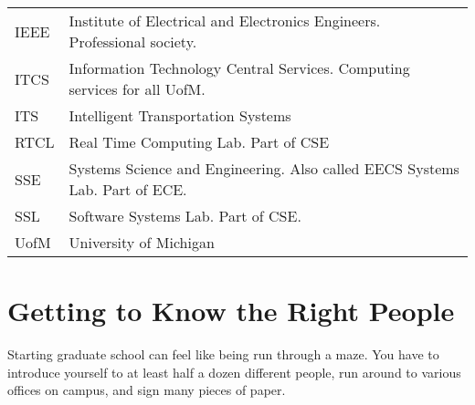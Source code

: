 \documentclass[11pt]{article}
\begin{document}
\begin{center}
\begin{tabular}{ll}
 IEEE              &  Institute of Electrical and Electronics Engineers.  Professional society.           \\
 ITCS              &  Information Technology Central Services.  Computing services for all UofM.          \\
 ITS               &  Intelligent Transportation Systems                                                  \\
 RTCL              &  Real Time Computing Lab.  Part of CSE                                               \\
 SSE               &  Systems Science and Engineering.  Also called EECS Systems Lab.  Part of ECE.       \\
 SSL               &  Software Systems Lab.  Part of CSE.                                                 \\
 UofM              &  University of Michigan                                                              \\
\hline
\hline
\end{tabular}
\end{center}
\section{Getting to Know the Right People}
\label{sec-15}

Starting graduate school can feel like being run through a maze.  You have to introduce yourself to at least half a dozen different people, run around to various offices on campus, and sign many pieces of paper.
\end{document}

